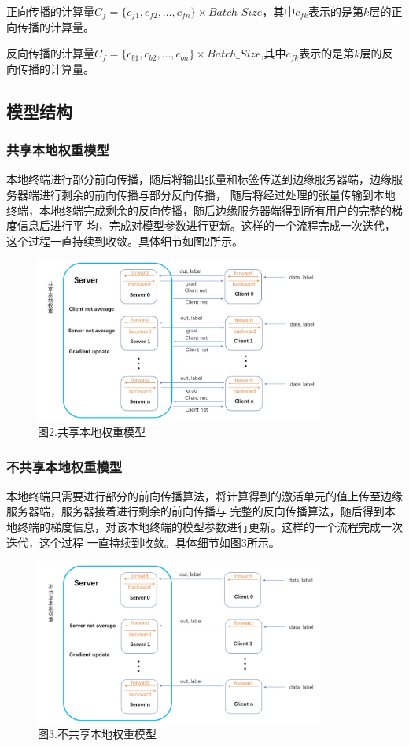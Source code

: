 \documentclass{article}
\begin{document}
正向传播的计算量$C_f = \{ c_{f1},c_{f2},\dots,c_{fn} \}\times Batch\_Size$，其中$c_{fk}$表示的是第$k$层的正向传播的计算量。

反向传播的计算量$C_f = \{c_{b1},c_{b2},\dots,c_{bn}\}\times Batch\_Size$,其中$c_{fk}$表示的是第$k$层的反向传播的计算量。

\subsection{模型结构}
\subsubsection{共享本地权重模型}
本地终端进⾏部分前向传播，随后将输出张量和标签传送到边缘服务器端，边缘服务器端进⾏剩余的前向传播与部分反向传播，
随后将经过处理的张量传输到本地终端，本地终端完成剩余的反向传播，随后边缘服务器端得到所有⽤户的完整的梯度信息后进⾏平
均，完成对模型参数进⾏更新。这样的⼀个流程完成⼀次迭代，这个过程⼀直持续到收敛。具体细节如图2所示。


\begin{figure}[H]
    \centering
    \includegraphics[width=0.85\textwidth]{./figure/1.jpg}  
    \caption*{图2.共享本地权重模型}
\end{figure}


\subsubsection{不共享本地权重模型}
本地终端只需要进⾏部分的前向传播算法，将计算得到的激活单元的值上传⾄边缘服务器端，服务器接着进⾏剩余的前向传播与
完整的反向传播算法，随后得到本地终端的梯度信息，对该本地终端的模型参数进⾏更新。这样的⼀个流程完成⼀次迭代，这个过程
⼀直持续到收敛。具体细节如图3所示。

\begin{figure}[H]
    \centering
    \includegraphics[width=0.85\textwidth]{./figure/2.jpg}  
    \caption*{图3.不共享本地权重模型}
\end{figure}
\end{document}
